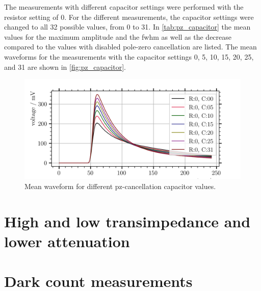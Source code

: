 The measurements with different capacitor settings were performed with the resistor setting of 0.
For the different measurements, the capacitor settings were changed to all 32 possible values, from 0 to 31.
In \autoref{tab:pz_capacitor} the mean values for the maximum amplitude and the \ac{fwhm} as well as the decrease compared to the values with disabled pole-zero cancellation are listed.
The mean waveforms for the measurements with the capacitor settings 0, 5, 10, 15, 20, 25, and 31 are shown in \autoref{fig:pz_capacitor}.
\begin{figure}
	\centering
	\includegraphics[width=1.\textwidth]{pictures/pz_capacitor.png}
	\caption[Mean waveform for different pz-cancellation capacitor values.]{Mean waveform for different pz-cancellation capacitor values.}
	\label{fig:pz_capacitor}
\end{figure}





\section{High and low transimpedance and lower attenuation}



\section{Dark count measurements}

